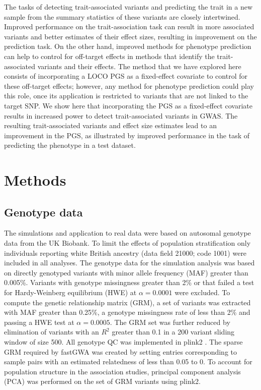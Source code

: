 \documentclass[fleqn,10pt]{wlscirep}
\begin{document}
The tasks of detecting trait-associated variants and predicting the trait in a new sample from the summary statistics of these variants are closely intertwined. Improved performance on the trait-association task can result in more associated variants and better estimates of their effect sizes, resulting in improvement on the prediction task. On the other hand, improved methods for phenotype prediction can help to control for off-target effects in methods that identify the trait-associated variants and their effects. The method that we have explored here consists of incorporating a LOCO PGS as a fixed-effect covariate to control for these off-target effects; however, any method for phenotype prediction could play this role, once its application is restricted to variants that are not linked to the target SNP. We show here that incorporating the PGS as a fixed-effect covariate results in increased power to detect trait-associated variants in GWAS. The resulting trait-associated variants and effect size estimates lead to an improvement in the PGS, as illustrated by improved performance in the task of predicting the phenotype in a test dataset. 

 
\section*{Methods}
\subsection*{Genotype data} 

The simulations and application to real data were based on autosomal genotype data from the UK Biobank. To limit the effects of population stratification only individuals reporting white British ancestry (data field 21000; code 1001) were included in all analyses. The genotype data for the simulation analysis was based on directly genotyped variants with minor allele frequency (MAF) greater than 0.005\%. Variants with genotype missingness greater than 2\% or that failed a test for Hardy-Weinberg equilibrium (HWE) at $\alpha{=0.0001}$ were excluded. To compute the genetic relationship matrix (GRM), a set of variants was extracted with MAF greater than 0.25\%, a genotype missingness rate of less than 2\% and passing a HWE test at $\alpha{=0.0005}$. The GRM set was further reduced by elimination of variants with an $R^2$ greater than 0.1 in a 200 variant sliding window of size 500. All genotype QC was implemented in plink2 \cite{chang2015second}. The sparse GRM required by fastGWA was created by setting entries corresponding to sample pairs with an estimated relatedness of less than 0.05 to 0. To account for population structure in the association studies, principal component analysis (PCA) was performed on the set of GRM variants using plink2.
\end{document}
